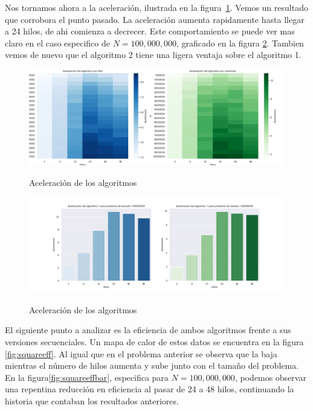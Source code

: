 \documentclass{report}
\begin{document}
Nos tornamos ahora a la aceleración, ilustrada en la figura~\ref{fig:squareaccel}.
Vemos un resultado que corrobora el punto pasado. La aceleración aumenta rapidamente
hasta llegar a 24 hilos, de ahi comienza a decrecer. Este comportamiento se puede
ver mas claro en el caso especifico de $N = 100,000,000$, graficado en la figura
\ref{fig:squareaccelbar}. Tambien vemos de nuevo que el algoritmo 2 tiene una
ligera ventaja sobre el algoritmo 1.

\begin{figure}[H]
    \centering
  \caption{Aceleración de los algoritmos}
  \includegraphics[width=\textwidth]{square-accel}
\label{fig:squareaccel}
\end{figure}

\begin{figure}[H]
    \centering
  \caption{Aceleración de los algoritmos}
  \includegraphics[width=\textwidth]{square-accel-bar}
\label{fig:squareaccelbar}
\end{figure}

El siguiente punto a analizar es la eficiencia de ambos algoritmos frente a sus
versiones secuenciales. Un mapa de calor de estos datos se encuentra en la figura
\ref{fig:squareeff}. Al igual que en el problema anterior se observa que la
baja mientras el número de hilos aumenta y sube junto con el tamaño del problema.
En la figura\ref{fig:squareeffbar}, especifica para $N = 100,000,000$, podemos
observar una repentina reducción en eficiencia al pasar de 24 a 48 hilos,
continuando la historia que contaban los resultados anteriores.
\end{document}
